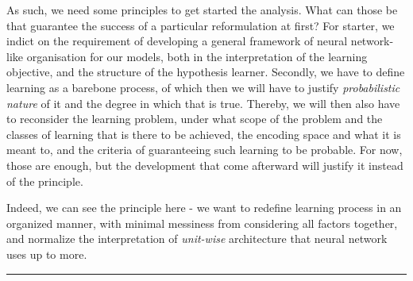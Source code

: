 As such, we need some principles to get started the analysis. What can those be that guarantee the success of a particular reformulation at first? For starter, we indict on the requirement of developing a general framework of neural network-like organisation for our models, both in the interpretation of the learning objective, and the structure of the hypothesis learner. Secondly, we have to define learning as a barebone process, of which then we will have to justify \textit{probabilistic nature} of it and the degree in which that is true. Thereby, we will then also have to reconsider the learning problem, under what scope of the problem and the classes of learning that is there to be achieved, the encoding space and what it is meant to, and the criteria of guaranteeing such learning to be probable. For now, those are enough, but the development that come afterward will justify it instead of the principle. 

Indeed, we can see the principle here - we want to redefine learning process in an organized manner, with minimal messiness from considering all factors together, and normalize the interpretation of \textit{unit-wise} architecture that neural network uses up to more. 

\noindent\rule{\linewidth}{1pt}

